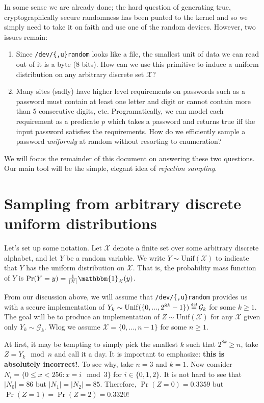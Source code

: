 \documentclass[10pt]{article}
\newcommand{\X}{\mathcal{X}}
\newcommand{\G}{\mathcal{G}}
\newcommand{\ind}{\mathbbm{1}}
\newcommand{\abs}[1]{\left| #1 \right|}
\newcommand{\Unif}{\mathrm{Unif}}
\newcommand\defeq{\stackrel{\mathclap{\normalfont\tiny\mbox{def}}}{=}}
\begin{document}
In some sense we are already done; the hard question of generating true,
cryptographically secure randomness has been punted to the kernel and so we
simply need to take it on faith and use one of the random devices. However, two
issues remain:
\begin{enumerate}
  \item Since \verb|/dev/{,u}random| looks like a file, the smallest unit of data
    we can read out of it is a byte (8 bits). How can we use this primitive to induce
    a uniform distribution on any arbitrary discrete set $\X$?
  \item Many sites (sadly) have higher level requirements on passwords such as 
    a password must contain at least one letter and digit or cannot contain
    more than 5 consecutive digits, etc. Programatically, we can model each
    requirement as a predicate $p$ which takes a password and returns true iff
    the input password satisfies the requirements. How do we efficiently sample
    a password \emph{uniformly} at random without resorting to enumeration?
\end{enumerate}
We will focus the remainder of this document on answering these two questions.
Our main tool will be the simple, elegant idea of \emph{rejection sampling}. 

\section{Sampling from arbitrary discrete uniform distributions}
Let's set up some notation. Let $\X$ denote a finite set over some arbitrary
discrete alphabet, and let $Y$ be a random variable. We write $Y \sim
\Unif(\X)$ to indicate that $Y$ has the uniform distribution on $\X$.  That is,
the probability mass function of $Y$ is $\Pr(Y=y) = \frac{1}{\abs{\X}}
\ind_{\X}(y)$.

From our discussion above, we will assume that \verb|/dev/{,u}random| provides
us with a secure implementation of $Y_k \sim \Unif(\{0, ..., 2^{8k} - 1\}) \defeq \G_k$ for some $k \geq 1$.
%
The goal will be to produce an implementation of $Z \sim \Unif(\X)$ for any
$\X$ given only $Y_k \sim \G_k$. Wlog we assume $\X = \{0, ..., n-1\}$ for some $n
\geq 1$.

At first, it may be tempting to simply pick the smallest $k$ such that $2^{8k}
\geq n$, take $Z = Y_k \mod{n}$ and call it a day. It is
important to emphasize: \textbf{this is absolutely incorrect!}.
%
To see why, take $n=3$ and $k=1$. Now consider $N_i = \{ 0 \leq x < 256 : x = i \mod{3}
\}$ for $i \in \{0,1,2\}$. It is not hard to see that $\abs{N_0} = 86$ but
$\abs{N_1}=\abs{N_2} = 85$. Therefore, $\Pr(Z=0) = 0.3359$ but
$\Pr(Z=1)=\Pr(Z=2)=0.3320$!
\end{document}
